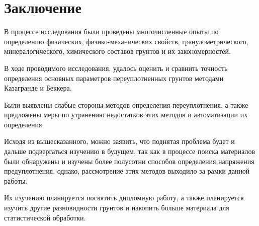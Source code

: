 \chapter*{Заключение}                       %


В процессе исследования были проведены многочисленные опыты по определению физических, физико-механических свойств, гранулометрического, минералогического, химического составов грунтов и их закономерностей. 

В ходе проводимого исследования, удалось оценить и сравнить точность определения основных параметров переуплотненных грунтов методами Казагранде и Беккера.

Были выявлены слабые стороны методов определения переуплотнения, а также предложены меры по утранению недостатков этих методов и автоматизации их определения.


Исходя из вышесказанного, можно заявить, что поднятая проблема будет и дальше подвергаться изучению в будущем, так как в процессе поиска материалов были обнаружены и изучены более полусотни способов определения напряжения предуплотнения, однако, рассмотрение этих методов выходило за рамки данной работы.

Их изучению планируется посвятить дипломную работу, а также планируется изучить другие разновидности грунтов и накопить больше материала для статистической обработки.
